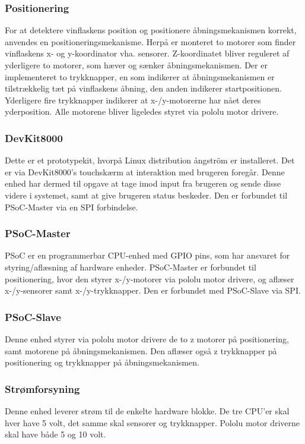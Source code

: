 \subsubsection{Positionering}
For at detektere vinflaskens position og positionere åbningsmekanismen korrekt, anvendes en positioneringsmekanisme. Herpå er monteret to motorer som finder
vinflaskens x- og y-koordinator vha. sensorer. Z-koordinatet bliver reguleret af yderligere to motorer, som hæver og sænker åbningsmekanismen. 
Der er implementeret to trykknapper, en som indikerer at åbningsmekanismen er tilstrækkelig tæt på vinflaskens åbning, den anden indikerer startpositionen. 
Yderligere fire trykknapper indikerer at x-/y-motorerne har nået deres yderposition. Alle motorene bliver ligeledes styret via pololu motor drivere. \\

\subsubsection{DevKit8000}
Dette er et prototypekit, hvorpå Linux distribution ångström er installeret. Det er via DevKit8000's touchskærm at interaktion med brugeren foregår. 
Denne enhed har dermed til opgave at tage imod input fra brugeren og sende disse videre i systemet, samt at give brugeren status beskeder. Den er forbundet til PSoC-Master via en SPI forbindelse. \\

\subsubsection{PSoC-Master}
PSoC er en programmerbar CPU-enhed med GPIO pins, som har ansvaret for styring/aflæsning af hardware enheder. PSoC-Master er forbundet til positionering, 
hvor den styrer x-/y-motorer via pololu motor drivere, og aflæser x-/y-sensorer samt x-/y-trykknapper. Den er forbundet med PSoC-Slave via SPI. \\

\subsubsection{PSoC-Slave}
Denne enhed styrer via pololu motor drivere de to z motorer på positionering, samt motorene på åbningsmekanismen. Den aflæser også z trykknapper på 
positionering og trykknapper på åbningsmekanismen. \\

\subsubsection{Strømforsyning}
Denne enhed leverer strøm til de enkelte hardware blokke. De tre CPU'er skal hver have 5 volt, det samme skal sensorer og trykknapper. Pololu motor driverne 
skal have både 5 og 10 volt. \\

